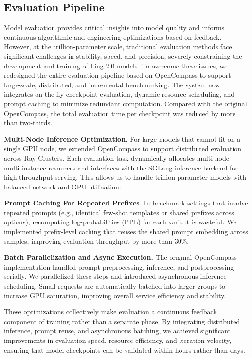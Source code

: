 \documentclass[table]{gtech}
\theoremstyle{definition}
\begin{document}
\subsection{Evaluation Pipeline}
Model evaluation provides critical insights into model quality and informs continuous algorithmic and engineering optimizations based on feedback. However, at the trillion-parameter scale, traditional evaluation methods face significant challenges in stability, speed, and precision, severely constraining the development and training of  Ling 2.0 models.
To overcome these issues, we redesigned the entire evaluation pipeline based on OpenCompass \citep{2023opencompass} to support large-scale, distributed, and incremental benchmarking. The system now integrates on-the-fly checkpoint evaluation, dynamic resource scheduling, and prompt caching to minimize redundant computation. Compared with the original OpenCompass, the total evaluation time per checkpoint was reduced by more than two-thirds.

\textbf{Multi-Node Inference Optimization.} For large models that cannot fit on a single GPU node, we extended OpenCompass to support distributed evaluation across Ray Clusters. Each evaluation task dynamically allocates multi-node multi-instance resources and interfaces with the SGLang \citep{zheng2024sglang} inference backend for high-throughput serving. This allows us to handle trillion-parameter models with balanced network and GPU utilization.

\textbf{Prompt Caching For Repeated Prefixes.} In benchmark settings that involve repeated prompts (e.g., identical few-shot templates or shared prefixes across options), recomputing log-probabilities (PPL) for each variant is wasteful. We implemented prefix-level caching that reuses the shared prompt embedding across samples, improving evaluation throughput by more than 30\%.

\textbf{Batch Parallelization and Async Execution.} The original OpenCompass implementation handled prompt preprocessing, inference, and postprocessing serially. We parallelized these steps and introduced asynchronous inference scheduling. Small requests are automatically batched into larger groups to increase GPU saturation, improving overall service efficiency and stability.

These optimizations collectively make evaluation a continuous feedback component of training rather than a separate phase. By integrating distributed inference, prompt reuse, and asynchronous batching, we achieved significant improvements in evaluation speed, resource efficiency, and iteration velocity, ensuring that model checkpoints can be validated within hours rather than days.
\end{document}
